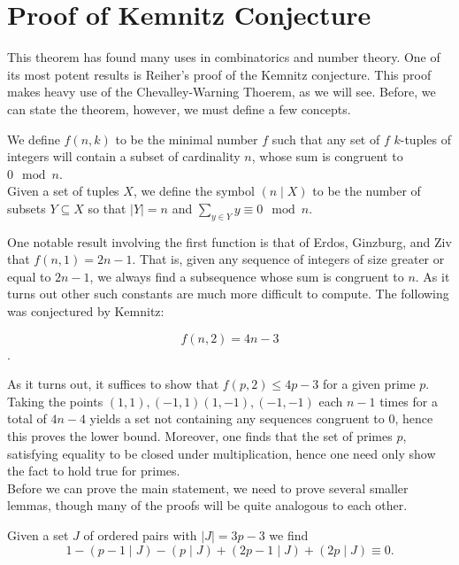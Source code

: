 \section{Proof of Kemnitz Conjecture}
This theorem has found many uses in combinatorics and number theory. One of its most potent results is Reiher's proof of the Kemnitz conjecture. This proof makes heavy use of the Chevalley-Warning Thoerem, as we will see. Before, we can state the theorem, however, we must define a few concepts.
\begin{definition}
	We define \(f\left( n, k \right) \) to be the minimal number \(f\) such that any set of \(f\) \(k\)-tuples of integers will contain a subset of cardinality \(n\), whose sum is congruent to \(0 \mod n\). \\
	Given a set of tuples \(X\), we define the symbol \(\left( n \mid X \right) \) to be the number of subsets \(Y \subseteq X\) so that \(\left| Y \right|  = n\) and \(\sum_{y \in Y}^{} y \equiv 0 \mod n\).
\end{definition}
One notable result involving the first function is that of Erdos, Ginzburg, and Ziv that \(f\left( n, 1 \right) = 2n-1\). That is, given any sequence of integers of size greater or equal to \(2n-1\), we always find a subsequence whose sum is congruent to \(n\). As it turns out other such constants are much more difficult to compute. The following was conjectured by Kemnitz:
\begin{theorem}
	\[f\left( n, 2 \right) = 4n-3\].
\end{theorem}
As it turns out, it suffices to show that \(f\left( p, 2 \right) \le 4p-3\) for a given prime \(p\). Taking the points \(\left( 1, 1 \right), \left( -1, 1 \right) \left( 1, -1 \right) ,\left( -1, -1 \right) \) each \(n-1\) times for a total of \(4n-4\) yields a set not containing any sequences congruent to \(0\), hence this proves the lower bound. Moreover, one finds that the set of primes \(p\), satisfying equality to be closed under multiplication, hence one need only show the fact to hold true for primes.\\
Before we can prove the main statement, we need to prove several smaller lemmas, though many of the proofs will be quite analogous to each other.
\begin{lemma}
	Given a set \(J\) of ordered pairs with \(\left| J \right| = 3p-3  \) we find \[
		1 - \left( p-1 \mid J \right)  - \left( p \mid J \right)  + \left( 2p-1 \mid J \right) + \left( 2p \mid J \right) \equiv 0
	.\]
\end{lemma}
